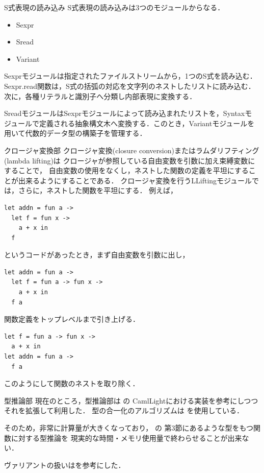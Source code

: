 \documentclass[a4paper,titlepage,report,disablejfam]{jsbook}
\begin{document}
\begin{resbonsiblesection}{S式表現の読み込み}{\kobori}\label{sc:impl-s-reader}
S式表現の読み込みは3つのモジュールからなる．
\begin{itemize}
 \item Sexpr
 \item Sread
 \item Variant
\end{itemize}

Sexprモジュールは指定されたファイルストリームから，1つのS式を読み込む．
Sexpr.read関数は，S式の括弧の対応を文字列のネストしたリストに読み込む．
次に，各種リテラルと識別子へ分類し内部表現に変換する．

SreadモジュールはSexprモジュールによって読み込まれたリストを，Syntaxモ
ジュールで定義される抽象構文木へ変換する．このとき，Variantモジュールを
用いて代数的データ型の構築子を管理する．
\end{resbonsiblesection}

\begin{resbonsiblesection}{クロージャ変換部}{\sakamoto}\label{sc:impl-lambda-lifting}
クロージャ変換(closure conversion)またはラムダリフティング(lambda lifting)は
クロージャが参照している自由変数を引数に加え束縛変数にすることで，
自由変数の使用をなくし，ネストした関数の定義を平坦にすることが出来るようにすることである．
クロージャ変換を行うLLiftingモジュールでは，さらに，ネストした関数を平坦にする．
例えば，
\begin{lstlisting}
let addn = fun a ->
  let f = fun x ->
    a + x in
  f
\end{lstlisting}
というコードがあったとき，まず自由変数を引数に出し，
\begin{lstlisting}
let addn = fun a ->
  let f = fun a -> fun x ->
    a + x in
  f a
\end{lstlisting}
関数定義をトップレベルまで引き上げる．
\begin{lstlisting}
let f = fun a -> fun x ->
  a + x in
let addn = fun a ->
  f a
\end{lstlisting}
このようにして関数のネストを取り除く．
\end{resbonsiblesection}

\begin{resbonsiblesection}{型推論部}{\sakamoto}\label{sc:impl-type-inference}
現在のところ，型推論部は
\algorithmW\cite{Milner1978348}\cite{Damas:1982:PTF:582153.582176}の
CamlLightにおける実装\cite{Lee:1998:PFL:291891.291892}を参考にしつつ
それを拡張して利用した．
型の合一化のアルゴリズムは
\algorithmU\cite{DBLP:books/el/RV01/BaaderS01}
を使用している．

そのため，非常に計算量が大きくなっており，
\cite{DBLP:journals/jfp/HengleinM94}の
第3節にあるような型をもつ関数に対する型推論を
現実的な時間・メモリ使用量で終わらせることが出来ない．

ヴァリアントの扱いは\cite{DBLP:conf/ctcs/Hagino87}を参考にした．
\end{resbonsiblesection}
\end{document}
